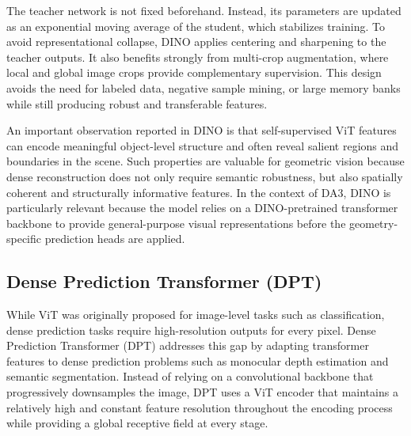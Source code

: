 The teacher network is not fixed beforehand. Instead, its parameters are updated as an exponential moving average of the student, which stabilizes training.\cite{caron2021dino} To avoid representational collapse, DINO applies centering and sharpening to the teacher outputs. It also benefits strongly from multi-crop augmentation, where local and global image crops provide complementary supervision. This design avoids the need for labeled data, negative sample mining, or large memory banks while still producing robust and transferable features.

An important observation reported in DINO is that self-supervised ViT features can encode meaningful object-level structure and often reveal salient regions and boundaries in the scene.\cite{caron2021dino} Such properties are valuable for geometric vision because dense reconstruction does not only require semantic robustness, but also spatially coherent and structurally informative features. In the context of DA3, DINO is particularly relevant because the model relies on a DINO-pretrained transformer backbone to provide general-purpose visual representations before the geometry-specific prediction heads are applied.

\subsection{Dense Prediction Transformer (DPT)}
While ViT was originally proposed for image-level tasks such as classification, dense prediction tasks require high-resolution outputs for every pixel. Dense Prediction Transformer (DPT) addresses this gap by adapting transformer features to dense prediction problems such as monocular depth estimation and semantic segmentation.\cite{ranftl2021dpt} Instead of relying on a convolutional backbone that progressively downsamples the image, DPT uses a ViT encoder that maintains a relatively high and constant feature resolution throughout the encoding process while providing a global receptive field at every stage.

